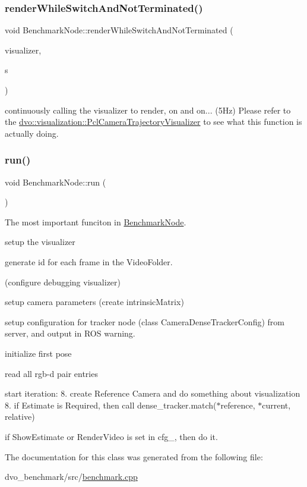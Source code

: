 \subsubsection{\texorpdfstring{render\+While\+Switch\+And\+Not\+Terminated()}{renderWhileSwitchAndNotTerminated()}}
{\footnotesize\ttfamily void Benchmark\+Node\+::render\+While\+Switch\+And\+Not\+Terminated (\begin{DoxyParamCaption}\item[{\mbox{\hyperlink{classdvo_1_1visualization_1_1_camera_trajectory_visualizer_interface}{dvo\+::visualization\+::\+Camera\+Trajectory\+Visualizer\+Interface}} $\ast$}]{visualizer,  }\item[{const \mbox{\hyperlink{structdvo_1_1visualization_1_1_switch}{dvo\+::visualization\+::\+Switch}} \&}]{s }\end{DoxyParamCaption})}

continuously calling the visualizer to render, on and on... (5\+Hz) Please refer to the \mbox{\hyperlink{classdvo_1_1visualization_1_1_pcl_camera_trajectory_visualizer}{dvo\+::visualization\+::\+Pcl\+Camera\+Trajectory\+Visualizer}} to see what this function is actually doing. \mbox{\label{class_benchmark_node_a4f509351e1c61f174f64146fe3abb463}} 
\subsubsection{\texorpdfstring{run()}{run()}}
{\footnotesize\ttfamily void Benchmark\+Node\+::run (\begin{DoxyParamCaption}{ }\end{DoxyParamCaption})}

The most important funciton in \mbox{\hyperlink{class_benchmark_node}{Benchmark\+Node}}.
\begin{DoxyEnumerate}
\item setup the visualizer
\item generate id for each frame in the Video\+Folder.
\item (configure debugging visualizer)
\item setup camera parameters (create intrinsic\+Matrix)
\item setup configuration for tracker node (class Camera\+Dense\+Tracker\+Config) from server, and output in R\+OS warning.
\item initialize first pose
\item read all rgb-\/d pair entries
\item start iteration\+: 8. create Reference Camera and do something about visualization 8. if Estimate is Required, then call dense\+\_\+tracker.\+match($\ast$reference, $\ast$current, relative)
\item if Show\+Estimate or Render\+Video is set in cfg\+\_\+, then do it. 
\end{DoxyEnumerate}

The documentation for this class was generated from the following file\+:\begin{DoxyCompactItemize}
\item 
dvo\+\_\+benchmark/src/\mbox{\hyperlink{benchmark_8cpp}{benchmark.\+cpp}}\end{DoxyCompactItemize}

